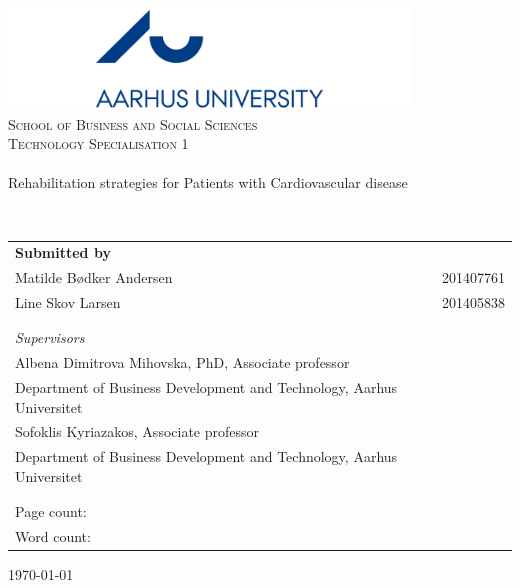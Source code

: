 \begin{titlingpage}
\begin{center}

~ \\[2.0cm]

\includegraphics[width=0.8\textwidth]{Figure/Ase} ~\\[0.5cm]

\textsc{\LARGE School of Business and Social Sciences}\\[0.5cm]

\textsc{\Large Technology Specialisation 1} ~\\[1.0cm]


\noindent\makebox[\linewidth]{\rule{\textwidth}{0.4pt}}\\
[0.5cm]{\Huge Rehabilitation strategies for Patients with Cardiovascular disease }
\noindent\makebox[\linewidth]{\rule{\textwidth}{0.4pt}}

\end{center}
~ \\[0.5cm]



\begin{table}[H]
\begin{tabular}{ll}
\textbf{Submitted by} & \\
Matilde Bødker Andersen  & 201407761 \\
Line Skov Larsen & 201405838 \\

\\ \\
\textit{Supervisors} & \\
Albena Dimitrova Mihovska, PhD, Associate professor & \\
Department of Business Development and Technology, Aarhus Universitet & \\[1ex]

Sofoklis Kyriazakos, Associate professor & \\
Department of Business Development and Technology, Aarhus Universitet & \\[1ex]
\\ \\
Page count: \pageref{LastPage} & \\


Word count: 
\end{tabular}
\end{table}
		

\vfill

\begin{center}
{\large \today}

\end{center}


\end{titlingpage}

\cleardoublepage